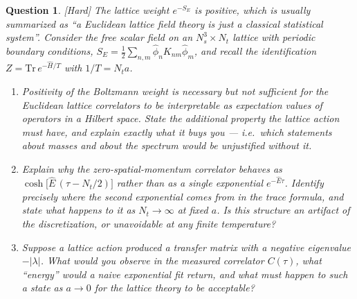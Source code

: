 \documentclass[11pt]{article}
\newcommand{\diff}[1]{\textcolor{blue!60!black}{\footnotesize\textsf{[#1]}}\quad}
\newtheorem{question}{Question}
\begin{document}
\begin{question}
\diff{Hard} The lattice weight $e^{-S_E}$ is positive, which is usually summarized as ``a Euclidean lattice field theory is just a classical statistical system''. Consider the free scalar field on an $N_s^3\times N_t$ lattice with periodic boundary conditions, $S_E = \tfrac{1}{2}\sum_{n,m}\hat\phi_n K_{nm}\hat\phi_m$, and recall the identification $Z = \mathrm{Tr}\, e^{-\hat H/T}$ with $1/T = N_t a$.
\begin{enumerate}[label=(\roman*), leftmargin=*]
  \item Positivity of the Boltzmann weight is \emph{necessary but not sufficient} for the Euclidean lattice correlators to be interpretable as expectation values of operators in a Hilbert space. State the additional property the lattice action must have, and explain exactly what it buys you --- i.e.\ which statements about masses and about the spectrum would be unjustified without it.
  \item Explain why the zero-spatial-momentum correlator behaves as $\cosh\!\big[\hat E\,(\tau - N_t/2)\big]$ rather than as a single exponential $e^{-\hat E \tau}$. Identify precisely where the second exponential comes from in the trace formula, and state what happens to it as $N_t\to\infty$ at fixed $a$. Is this structure an artifact of the discretization, or unavoidable at any finite temperature?
  \item Suppose a lattice action produced a transfer matrix with a \emph{negative} eigenvalue $-|\lambda|$. What would you observe in the measured correlator $C(\tau)$, what ``energy'' would a naive exponential fit return, and what must happen to such a state as $a\to 0$ for the lattice theory to be acceptable?
\end{enumerate}
\end{question}
\end{document}

